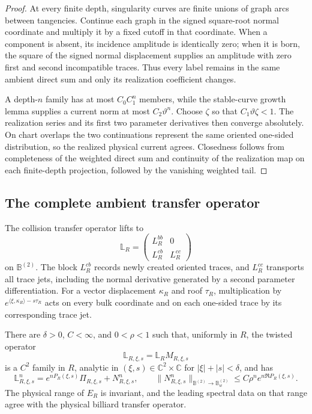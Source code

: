 \begin{proof}
At every finite depth, singularity curves are finite unions of graph arcs
between tangencies.  Continue each graph in the signed square-root normal
coordinate and multiply it by a fixed cutoff in that coordinate.  When a
component is absent, its incidence amplitude is identically zero; when it is
born, the square of the signed normal displacement supplies an amplitude with
zero first and second incompatible traces.  Thus every label remains in the
same ambient direct sum and only its realization coefficient changes.

A depth-\(n\) family has at most \(C_0C_1^n\) members, while the stable-curve
growth lemma supplies a current norm at most \(C_2\vartheta^n\).  Choose
\(\zeta\) so that \(C_1\vartheta\zeta<1\).  The realization series and its
first two parameter derivatives then converge absolutely.  On chart overlaps
the two continuations represent the same oriented one-sided distribution, so
the realized physical current agrees.  Closedness follows from completeness
of the weighted direct sum and continuity of the realization map on each
finite-depth projection, followed by the vanishing weighted tail.
\end{proof}

\subsection{The complete ambient transfer operator}

The collision transfer operator lifts to
\[
\mathbb L_R=
\begin{pmatrix}
L_R^{bb}&0\\
L_R^{cb}&L_R^{cc}
\end{pmatrix}
\]
on \(\mathbb B^{(2)}\).  The block \(L_R^{cb}\) records newly created
oriented traces, and \(L_R^{cc}\) transports all trace jets, including the
normal derivative generated by a second parameter differentiation.  For a
vector displacement \(\kappa_R\) and roof \(\tau_R\), multiplication by
\(e^{\langle\xi,\kappa_R\rangle-s\tau_R}\) acts on every bulk coordinate and
on each one-sided trace by its corresponding trace jet.

\begin{theorem}
\label{thm:r6-a2-spectrum}
There are \(\delta>0\), \(C<\infty\), and \(0<\rho<1\) such that, uniformly
in \(R\), the twisted operator
\[
\mathbb L_{R,\xi,s}
=\mathbb L_RM_{R,\xi,s}
\]
is a \(C^2\) family in \(R\), analytic in
\((\xi,s)\in\mathbb C^2\times\mathbb C\) for
\(|\xi|+|s|<\delta\), and has
\[
\mathbb L_{R,\xi,s}^n
=e^{nP_R(\xi,s)}\Pi_{R,\xi,s}+N_{R,\xi,s}^n,
\qquad
\|N_{R,\xi,s}^n\|_{\mathbb B^{(2)}\to\mathbb B_w^{(2)}}
\le C\rho^ne^{n\Re P_R(\xi,s)}.
\]
The physical range of \(E_R\) is invariant, and the leading spectral data on
that range agree with the physical billiard transfer operator.
\end{theorem}

